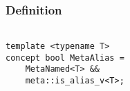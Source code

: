 
\subsubsection{Definition}

\begin{verbatim}

template <typename T>
concept bool MetaAlias =
	MetaNamed<T> &&
	meta::is_alias_v<T>;

\end{verbatim}
